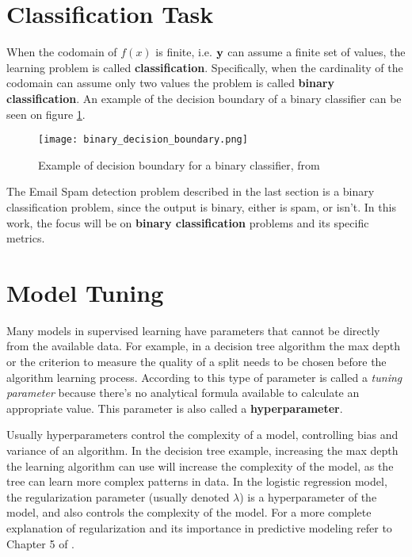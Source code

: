\section{Classification Task}

When the codomain of $f(x)$ is finite, i.e. $\textbf{\text{\textup{y}}}$ can assume a finite set of values, the learning problem is called \textbf{classification}. Specifically, when the cardinality of the codomain can assume only two values the problem is called \textbf{binary classification}. An example of the decision boundary of a binary classifier can be seen on figure  \ref{fig:binaryclassifier}.

\begin{figure}[!h]
    \centering
    \texttt{[image: binary\_decision\_boundary.png]} 
    \caption{Example of decision boundary for a binary classifier, from \cite{hastie2009elements}}
    \label{fig:binaryclassifier}
\end{figure}

The Email Spam detection problem described in the last section is a binary classification problem, since the output is binary, either is spam, or isn't. In this work, the focus will be on \textbf{binary classification} problems and its specific metrics.

\section{Model Tuning}

Many models in supervised learning have parameters that cannot be directly from the available data. For example, in a decision tree algorithm the max depth or the criterion to measure the quality of a split needs to be chosen before the algorithm learning process. According to \cite{kuhn2013applied} this type of parameter is called a \textit{tuning parameter} because there's no analytical formula available to calculate an appropriate value. This parameter is also called a \textbf{hyperparameter}. 

Usually hyperparameters control the complexity of a model, controlling bias and variance of an algorithm. In the decision tree example, increasing the max depth the learning algorithm can use will increase the complexity of the model, as the tree can learn more complex patterns in data. In the logistic regression model, the regularization parameter (usually denoted $\lambda$) is a hyperparameter of the model, and also controls the complexity of the model. For a more complete explanation of regularization and its importance in predictive modeling refer to Chapter 5 of \cite{hastie2009elements}.

